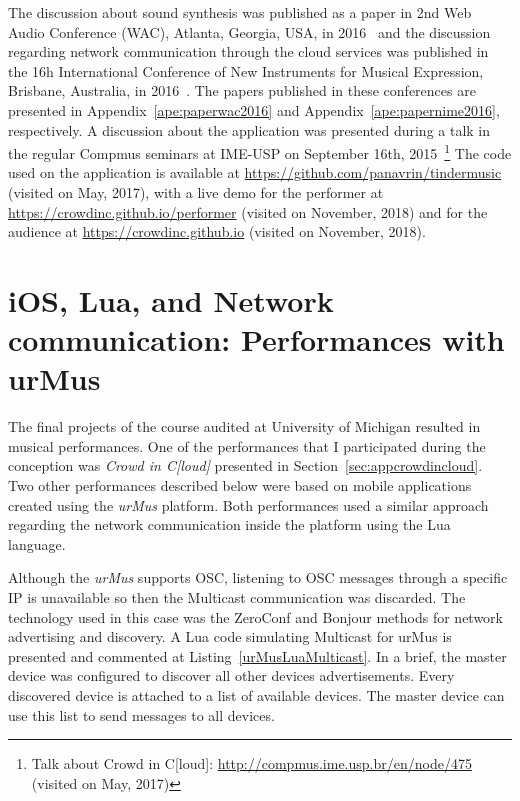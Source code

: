 The discussion about sound synthesis was published as a paper in 2nd Web Audio Conference (WAC), Atlanta, Georgia,  USA, in 2016~\citep{Lee2016crowd} and the discussion regarding network communication through the cloud services was published in the 16h International Conference of New Instruments for Musical Expression, Brisbane, Australia, in 2016~\citep{deCarvalhoJunior2016understanding}.
The papers published in these conferences are presented in Appendix~\ref{ape:paperwac2016} and Appendix~\ref{ape:papernime2016}, respectively.
A discussion about the application was presented during a talk in the regular Compmus seminars at IME-USP on September 16th, 2015~\footnote{Talk about Crowd in C[loud]: \url{http://compmus.ime.usp.br/en/node/475} (visited on May, 2017)}
The code used on the application is available at \url{https://github.com/panavrin/tindermusic} (visited on May, 2017), with a live demo for the performer at \url{https://crowdinc.github.io/performer} (visited on November, 2018) and for the audience at \url{https://crowdinc.github.io} (visited on November, 2018).

\section{iOS, Lua, and Network communication: Performances with urMus}
\label{apesec:appsumich}

The final projects of the course audited at University of Michigan resulted in musical performances.
One of the performances that I participated during the conception was \textit{Crowd in C[loud]} presented in Section~\ref{sec:appcrowdincloud}.
Two other performances described below were based on mobile applications created using the \textit{urMus} platform.
Both performances used a similar approach regarding the network communication inside the platform using the Lua language.

Although the \textit{urMus} supports OSC, listening to OSC messages through a specific IP is unavailable so then the Multicast communication was discarded.
The technology used in this case was the ZeroConf and Bonjour methods for network advertising and discovery.
A Lua code simulating Multicast for urMus is presented and commented at Listing~\ref{urMusLuaMulticast}.
In a brief, the master device was configured to discover all other devices advertisements.
Every discovered device is attached to a list of available devices.
The master device can use this list to send messages to all devices.


